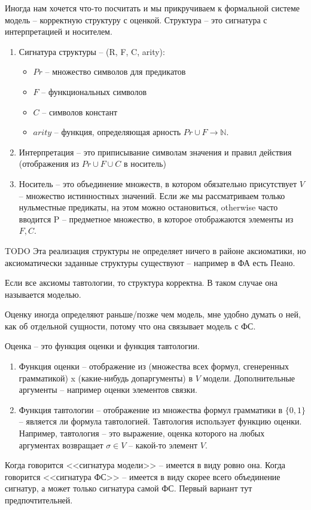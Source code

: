 Иногда нам хочется что-то посчитать и мы прикручиваем к
формальной системе модель -- корректную структуру с оценкой.
Структура -- это сигнатура с интерпретацией и носителем.
\begin{enumerate}
\item Сигнатура структуры -- (R, F, C, arity):
\begin{itemize}
\item $Pr$ -- множество символов для предикатов
\item $F$ -- функциональных символов
\item $C$ -- символов констант
\item $arity$ – функция, определяющая арность $Pr \cup F \to \mathbb N$.
\end{itemize}
\item Интерпретация -- это приписывание символам значения
и правил действия (отображения из $Pr \cup F \cup C$ в носитель)
\item Носитель -- это объединение множеств, в котором обязательно
присутствует $V$ -- множество истин\-ност\-ных зна\-че\-ний. Если же
мы рассматриваем только нуль\-мест\-ные предикаты, на этом
можно остановиться, otherwise часто вводится P -- предметное
множество, в которое отображаются элементы из $F, C$.
\end{enumerate}
TODO Эта реализация структуры не определяет ничего в районе
аксиоматики, но аксиоматически заданные структуры существуют
– например в ФА есть Пеано.

Если все аксиомы тавтологии, то структура корректна.
В таком случае она называется моделью.

Оценку иногда определяют раньше/позже чем модель, мне
удобно думать о ней, как об отдельной сущности, потому что
она связывает модель с ФС.

Оценка -- это функция оценки и функция тавтологии.
\begin{enumerate}
\item Функция оценки -- отображение из (множества всех формул,
сгенеренных грамматикой) x (какие-нибудь допаргументы)
в $V$ модели. Дополнительные аргументы -- например оценки
элементов связки.
\item Функция тавтологии -- отображение из множества формул
грамматики в $\{0, 1\}$ -- является ли формула тавтологией.
Тавтология использует функцию оценки. Например, тавтология
-- это выражение, оценка которого на любых аргументах
возвращает $\sigma \in V$ -- какой-то элемент $V$.
\end{enumerate}

Когда говорится <<сигнатура модели>> -- имеется в виду ровно она.
Когда говорится <<сигнатура ФС>> -- имеется в виду скорее всего
объединение сигнатур, а может только сигнатура самой ФС. Первый
вариант тут предпочтительней.
